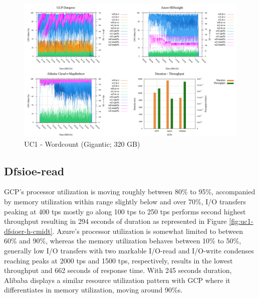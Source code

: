 \documentclass[review]{elsarticle}
\begin{document}
\begin{figure}[p]
	\caption{UC1 - Wordcount (Gigantic; 320 GB)}
	\label{fig:uc1-wrdcnt-g-cmidt}
	\includegraphics[width=\textwidth]{uc1-wrdcnt-g-cmidt}
	\centering
\end{figure}


\subsection{Dfsioe-read}
GCP's processor utilization is moving roughly between 80\% to 95\%, accompanied by memory utilization within range slightly below and over 70\%, I/O transfers peaking at 400 tps mostly go along 100 tps to 250 tps performs second highest throughput resulting in 294 seconds of duration as represented in Figure \ref{fig:uc1-dfsioer-h-cmidt}. Azure's processor utilization is somewhat limited to between 60\% and 90\%, whereas the memory utilization behaves between 10\% to 50\%, generally low I/O transfers with two markable I/O-read and I/O-write condenses reaching peaks at 2000 tps and 1500 tps, respectively, results in the lowest throughput and 662 seconds of response time. With 245 seconds duration, Alibaba displays a similar resource utilization pattern with GCP where it differentiates in memory utilization, moving around 90\%s.
\end{document}
